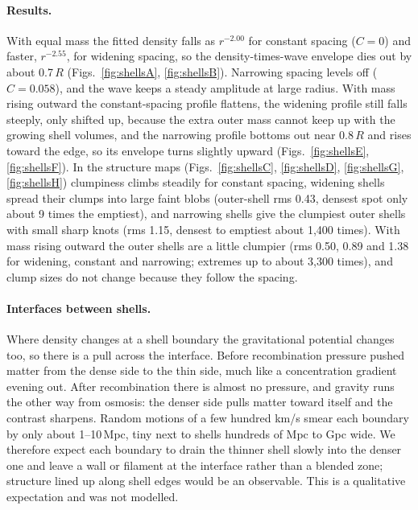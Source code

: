 \documentclass[aps,prd,twocolumn,nofootinbib,superscriptaddress,floatfix]{revtex4-2}
\begin{document}
\paragraph*{Results.} With equal mass the fitted density falls as $r^{-2.00}$ for constant spacing ($C=0$) and faster, $r^{-2.55}$, for widening spacing, so the density-times-wave envelope dies out by about 0.7\,$R$ (Figs.~\ref{fig:shellsA}, \ref{fig:shellsB}). Narrowing spacing levels off ($C=0.058$), and the wave keeps a steady amplitude at large radius. With mass rising outward the constant-spacing profile flattens, the widening profile still falls steeply, only shifted up, because the extra outer mass cannot keep up with the growing shell volumes, and the narrowing profile bottoms out near 0.8\,$R$ and rises toward the edge, so its envelope turns slightly upward (Figs.~\ref{fig:shellsE}, \ref{fig:shellsF}). In the structure maps (Figs.~\ref{fig:shellsC}, \ref{fig:shellsD}, \ref{fig:shellsG}, \ref{fig:shellsH}) clumpiness climbs steadily for constant spacing, widening shells spread their clumps into large faint blobs (outer-shell rms 0.43, densest spot only about 9 times the emptiest), and narrowing shells give the clumpiest outer shells with small sharp knots (rms 1.15, densest to emptiest about 1,400 times). With mass rising outward the outer shells are a little clumpier (rms 0.50, 0.89 and 1.38 for widening, constant and narrowing; extremes up to about 3,300 times), and clump sizes do not change because they follow the spacing.

\paragraph*{Interfaces between shells.} Where density changes at a shell boundary the gravitational potential changes too, so there is a pull across the interface. Before recombination pressure pushed matter from the dense side to the thin side, much like a concentration gradient evening out. After recombination there is almost no pressure, and gravity runs the other way from osmosis: the denser side pulls matter toward itself and the contrast sharpens. Random motions of a few hundred km/s smear each boundary by only about 1--10\,Mpc, tiny next to shells hundreds of Mpc to Gpc wide. We therefore expect each boundary to drain the thinner shell slowly into the denser one and leave a wall or filament at the interface rather than a blended zone; structure lined up along shell edges would be an observable. This is a qualitative expectation and was not modelled.
\end{document}
